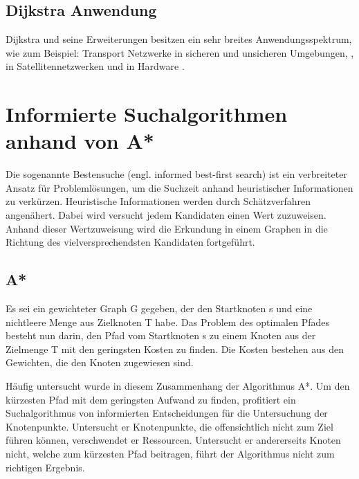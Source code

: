 \subsection{Dijkstra Anwendung}

Dijkstra und seine Erweiterungen besitzen ein sehr breites Anwendungsspektrum, wie zum Beispiel: Transport Netzwerke in sicheren und unsicheren Umgebungen, \cite{fuzzyDijk} \cite{publicTrans2}, in Satellitennetzwerken \cite{satelite} und in Hardware \cite{hardware}. 

\section{Informierte Suchalgorithmen anhand von A*}

Die sogenannte Bestensuche (engl. informed best-first search) ist ein verbreiteter Ansatz für Problemlösungen, um die Suchzeit anhand heuristischer Informationen zu verkürzen. Heuristische Informationen werden durch Schätzverfahren angenähert. Dabei wird versucht jedem Kandidaten einen Wert zuzuweisen. Anhand dieser Wertzuweisung wird die Erkundung in einem Graphen in die Richtung des vielversprechendsten Kandidaten fortgeführt.

\subsection{A*} 

Es sei ein gewichteter Graph G gegeben, der den Startknoten s und eine nichtleere Menge aus Zielknoten T habe. Das Problem des optimalen Pfades besteht nun darin, den Pfad vom Startknoten s zu einem Knoten aus der Zielmenge T mit den geringsten Kosten zu finden. Die Kosten bestehen aus den Gewichten, die den Knoten zugewiesen sind\cite{RinaDechterandJudeaPearl.1983}.

Häufig untersucht wurde in diesem Zusammenhang der Algorithmus A*. Um den kürzesten Pfad mit dem geringsten Aufwand zu finden, profitiert ein Suchalgorithmus von informierten Entscheidungen für die Untersuchung der Knotenpunkte. Untersucht er Knotenpunkte, die offensichtlich nicht zum Ziel führen können, verschwendet er Ressourcen. Untersucht er andererseits Knoten nicht, welche zum kürzesten Pfad beitragen, führt der Algorithmus nicht zum richtigen Ergebnis.

